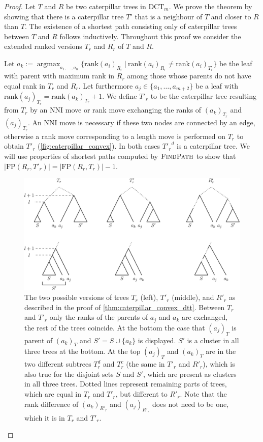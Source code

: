 \documentclass[11pt]{amsart}
\newcommand{\findpath}{\textsc{FindPath}}
\newcommand{\rank}{\mathrm{rank}}
\newcommand{\nni}{\mathrm{NNI}}
\newcommand{\fp}{\mathrm{FP}}
\newcommand{\dtt}{\mathrm{DCT}}
\DeclareMathOperator*{\argmax}{argmax}
\begin{document}
\begin{proof}
	Let $T$ and $R$ be two caterpillar trees in $\dtt_m$.
	We prove the theorem by showing that there is a caterpillar tree $T'$ that is a neighbour of $T$ and closer to $R$ than $T$.
	The existence of a shortest path consisting only of caterpillar trees between $T$ and $R$ follows inductively.
	Throughout this proof we consider the extended ranked versions $T_r$ and $R_r$ of $T$ and $R$.

	Let $a_k := \argmax_{a_1, \ldots, a_n}\{\rank(a_i)_{R_r} \ |\  \rank(a_i)_{R_r} \neq \rank(a_i)_{T_r}\}$ be the leaf with parent with maximum rank in $R_r$ among those whose parents do not have equal rank in $T_r$ and $R_r$.
	Let furthermore $a_j \in \{a_1, \ldots, a_{m+2}\}$ be a leaf with $\rank(a_j)_{T_r} = \rank(a_k)_{T_r} + 1$.
	We define $T'_r$ to be the caterpillar tree resulting from $T_r$ by an $\nni$ move or rank move exchanging the ranks of $(a_k)_{T_r}$ and $(a_j)_{T_r}$.
	An $\nni$ move is necessary if these two nodes are connected by an edge, otherwise a rank move corresponding to a length move is performed on $T_r$ to obtain $T'_r$ (\autoref{fig:caterpillar_convex}).
	In both cases ${T'_r}^d$ is a caterpillar tree.
	We will use properties of shortest paths computed by $\findpath$ to show that $|\fp(R_r,T'_r)| = |\fp(R_r,T_r)| - 1$.

	\begin{figure}[ht]
		\includegraphics[width=1\textwidth]{caterpillar_convex.eps}
		\caption{The two possible versions of trees $T_r$ (left), $T'_r$ (middle), and $R'_r$ as described in the proof of \autoref{thm:caterpillar_convex_dtt}.
		Between $T_r$ and $T'_r$ only the ranks of the parents of $a_j$ and $a_k$ are exchanged, the rest of the trees coincide.
		At the bottom the case that $(a_j)_T$ is parent of $(a_k)_T$ and $S' = S \cup \{a_k\}$ is displayed.
		$S'$ is a cluster in all three trees at the bottom.
		At the top $(a_j)_T$ and $(a_k)_T$ are in the two different subtrees $T_r^d$ and $T_r^c$ (the same in $T'_r$ and $R'_r$), which is also true for the disjoint sets $S$ and $S'$, which are present as clusters in all three trees.
		Dotted lines represent remaining parts of trees, which are equal in $T_r$ and $T'_r$, but different to $R'_r$.
		Note that the rank difference of $(a_k)_{R'_r}$ and $(a_j)_{R'_r}$ does not need to be one, which it is in $T_r$ and $T'_r$.
		\label{fig:caterpillar_convex}}
	\end{figure}


\end{proof}
\end{document}

